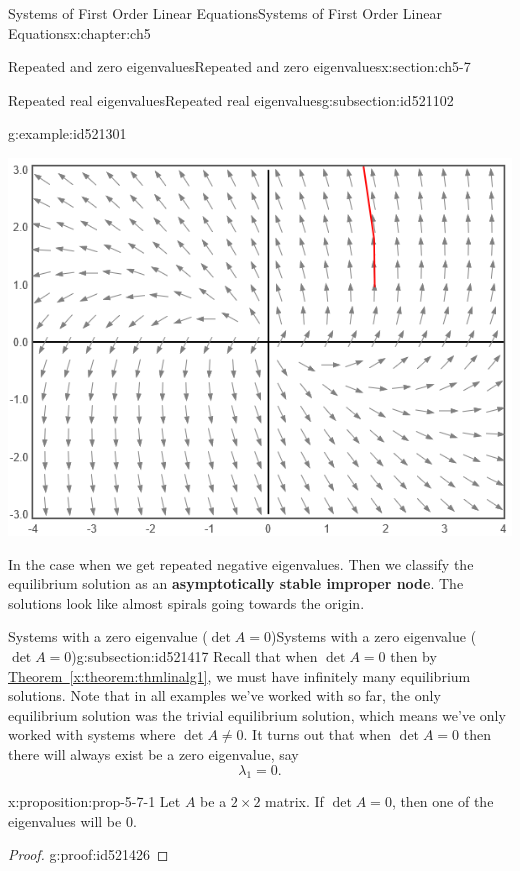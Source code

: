 \documentclass[oneside,10pt,]{book}
\newcommand{\xreffont}{\relax}
\newcommand{\terminology}[1]{\textbf{#1}}
\numberwithin{equation}{section}
\numberwithin{equation}{section}
\begin{document}
\begin{chapterptx}{Systems of First Order Linear Equations}{}{Systems of First Order Linear Equations}{}{}{x:chapter:ch5}
\begin{sectionptx}{Repeated and zero eigenvalues}{}{Repeated and zero eigenvalues}{}{}{x:section:ch5-7}
\begin{subsectionptx}{Repeated real eigenvalues}{}{Repeated real eigenvalues}{}{}{g:subsection:id521102}
\begin{example}{}{g:example:id521301}
\begin{image}{0}{1}{0}
\includegraphics[width=\linewidth]{images/7.8-1b.png}
\end{image}%
\end{example}
In the case when we get repeated negative eigenvalues. Then we classify the equilibrium solution as an \terminology{asymptotically stable improper node}. The solutions look like almost spirals going towards the origin.%
\end{subsectionptx}
%
%
\typeout{************************************************}
\typeout{************************************************}
%
\begin{subsectionptx}{Systems with a zero eigenvalue (\(\det A=0 \))}{}{Systems with a zero eigenvalue (\(\det A=0 \))}{}{}{g:subsection:id521417}
Recall that when \(\det A=0\) then by \hyperref[x:theorem:thmlinalg1]{Theorem~{\xreffont\ref{x:theorem:thmlinalg1}}}, we must have infinitely many equilibrium solutions. Note that in all examples we've worked with so far, the only equilibrium solution was the trivial equilibrium solution, which means we've only worked with systems where \(\det A\neq0\). It turns out that when \(\det A=0\) then there will always exist be a zero eigenvalue, say%
\begin{equation*}
\lambda_{1}=0.
\end{equation*}
%
\begin{proposition}{}{}{x:proposition:prop-5-7-1}%
Let \(A\) be a \(2\times 2\) matrix. If \(\det A=0\), then one of the eigenvalues will be \(0\).%
\end{proposition}
\begin{proof}{}{g:proof:id521426}

\end{proof}
\end{subsectionptx}
\end{sectionptx}
\end{chapterptx}
\end{document}
